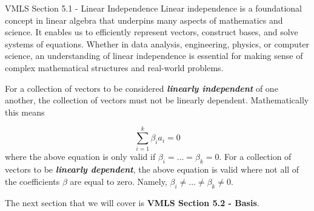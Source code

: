 \begin{notes}{VMLS Section 5.1 - Linear Independence}
    Linear independence is a foundational concept in linear algebra that underpins many aspects of mathematics and science. It enables us to efficiently represent vectors, construct bases, and solve 
    systems of equations. Whether in data analysis, engineering, physics, or computer science, an understanding of linear independence is essential for making sense of complex mathematical structures 
    and real-world problems.

    \begin{Highlight}
        For a collection of vectors to be considered \textit{\textbf{linearly independent}} of one another, the collection of vectors must not be linearly dependent. Mathematically this means

        \begin{equation*}
            \sum_{i = 1}^{k} \beta_{i}a_{i} = 0
        \end{equation*}
        where the above equation is only valid if $\beta_{i} = \dots = \beta_{k} = 0$. For a collection of vectors to be \textit{\textbf{linearly dependent}}, the above equation is valid where not all
        of the coefficients $\beta$ are equal to zero. Namely, $\beta_{i} \neq \dots \neq \beta_{k} \neq 0$.
    \end{Highlight}
\end{notes}

The next section that we will cover is \textbf{VMLS Section 5.2 - Basis}.

